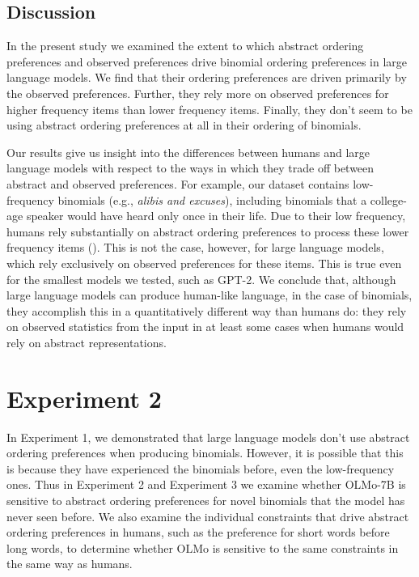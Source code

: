 \documentclass[
  12pt,
  letterpaper,
]{scrreprt}
\begin{document}
\subsection{Discussion}\label{discussion-5}

In the present study we examined the extent to which abstract ordering
preferences and observed preferences drive binomial ordering preferences
in large language models. We find that their ordering preferences are
driven primarily by the observed preferences. Further, they rely more on
observed preferences for higher frequency items than lower frequency
items. Finally, they don't seem to be using abstract ordering
preferences at all in their ordering of binomials.

Our results give us insight into the differences between humans and
large language models with respect to the ways in which they trade off
between abstract and observed preferences. For example, our dataset
contains low-frequency binomials (e.g., \emph{alibis and excuses}),
including binomials that a college-age speaker would have heard only
once in their life. Due to their low frequency, humans rely
substantially on abstract ordering preferences to process these lower
frequency items (). This
is not the case, however, for large language models, which rely
exclusively on observed preferences for these items. This is true even
for the smallest models we tested, such as GPT-2. We conclude that,
although large language models can produce human-like language, in the
case of binomials, they accomplish this in a quantitatively different
way than humans do: they rely on observed statistics from the input in
at least some cases when humans would rely on abstract representations.

\section{Experiment 2}\label{experiment-2-1}

In Experiment 1, we demonstrated that large language models don't use
abstract ordering preferences when producing binomials. However, it is
possible that this is because they have experienced the binomials
before, even the low-frequency ones. Thus in Experiment 2 and Experiment
3 we examine whether OLMo-7B is sensitive to abstract ordering
preferences for novel binomials that the model has never seen before. We
also examine the individual constraints that drive abstract ordering
preferences in humans, such as the preference for short words before
long words, to determine whether OLMo is sensitive to the same
constraints in the same way as humans.
\end{document}
